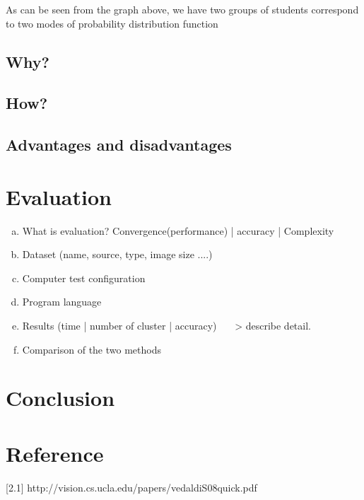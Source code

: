 \documentclass[13pt,a4paper]{report}
\begin{document}
As can be seen from the graph above, we have two groups of students correspond to two modes of probability distribution function

\subsection{Why?}

\subsection{How?}

\subsection{Advantages and disadvantages}

\section{Evaluation}

\begin{enumerate}[(a) ]
\item What is evaluation? Convergence(performance) | accuracy | Complexity
\item Dataset (name, source, type, image size ....)
\item Computer test configuration
\item Program language
\item Results (time | number of cluster | accuracy) ~~~> describe detail.
\item Comparison of the two methods
\end{enumerate}
	
	
\section{Conclusion}
\section{Reference}
[2.1] http://vision.cs.ucla.edu/papers/vedaldiS08quick.pdf
\end{document}
